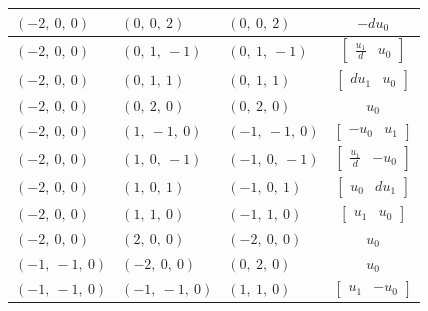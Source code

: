 \documentclass[11pt]{article}
\theoremstyle{definition}
\begin{document}
\begin{longtable}{|l|l|l|c|}
    \hline
    $\left( -2, \  0, \  0\right)$ & $\left( 0, \  0, \  2\right)$ & $\left( 0, \  0, \  2\right)$ & $- d u_{0}$ \\
    \hline
    $\left( -2, \  0, \  0\right)$ & $\left( 0, \  1, \  -1\right)$ & $\left( 0, \  1, \  -1\right)$ & $\left[\begin{matrix}\frac{u_{1}}{d} & u_{0}\end{matrix}\right]$ \\
    \hline
    $\left( -2, \  0, \  0\right)$ & $\left( 0, \  1, \  1\right)$ & $\left( 0, \  1, \  1\right)$ & $\left[\begin{matrix}d u_{1} & u_{0}\end{matrix}\right]$ \\
    \hline
    $\left( -2, \  0, \  0\right)$ & $\left( 0, \  2, \  0\right)$ & $\left( 0, \  2, \  0\right)$ & $u_{0}$ \\
    \hline
    $\left( -2, \  0, \  0\right)$ & $\left( 1, \  -1, \  0\right)$ & $\left( -1, \  -1, \  0\right)$ & $\left[\begin{matrix}- u_{0} & u_{1}\end{matrix}\right]$ \\
    \hline
    $\left( -2, \  0, \  0\right)$ & $\left( 1, \  0, \  -1\right)$ & $\left( -1, \  0, \  -1\right)$ & $\left[\begin{matrix}\frac{u_{1}}{d} & - u_{0}\end{matrix}\right]$ \\
    \hline
    $\left( -2, \  0, \  0\right)$ & $\left( 1, \  0, \  1\right)$ & $\left( -1, \  0, \  1\right)$ & $\left[\begin{matrix}u_{0} & d u_{1}\end{matrix}\right]$ \\
    \hline
    $\left( -2, \  0, \  0\right)$ & $\left( 1, \  1, \  0\right)$ & $\left( -1, \  1, \  0\right)$ & $\left[\begin{matrix}u_{1} & u_{0}\end{matrix}\right]$ \\
    \hline
    $\left( -2, \  0, \  0\right)$ & $\left( 2, \  0, \  0\right)$ & $\left( -2, \  0, \  0\right)$ & $u_{0}$ \\
    \hline
    $\left( -1, \  -1, \  0\right)$ & $\left( -2, \  0, \  0\right)$ & $\left( 0, \  2, \  0\right)$ & $u_{0}$ \\
    \hline
    $\left( -1, \  -1, \  0\right)$ & $\left( -1, \  -1, \  0\right)$ & $\left( 1, \  1, \  0\right)$ & $\left[\begin{matrix}u_{1} & - u_{0}\end{matrix}\right]$ \\

\end{longtable}
\end{document}
